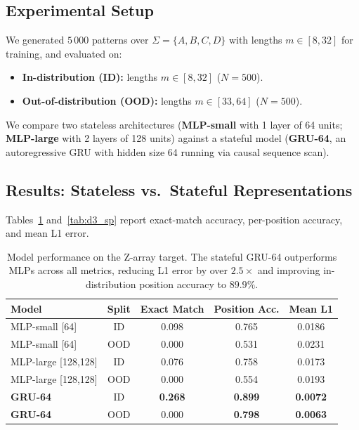 \documentclass[11pt,a4paper]{article}
\newcommand{\sigmaalph}{\Sigma}
\begin{document}
\subsection{Experimental Setup}
We generated $5\,000$ patterns over $\sigmaalph=\{A,B,C,D\}$ with lengths $m \in [8, 32]$ for training, and evaluated on:
\begin{itemize}
    \item \textbf{In-distribution (ID):} lengths $m \in [8, 32]$ ($N=500$).
    \item \textbf{Out-of-distribution (OOD):} lengths $m \in [33, 64]$ ($N=500$).
\end{itemize}
We compare two stateless architectures (\textbf{MLP-small} with 1 layer of 64 units; \textbf{MLP-large} with 2 layers of 128 units) against a stateful model (\textbf{GRU-64}, an autoregressive GRU with hidden size 64 running via causal sequence scan).

\subsection{Results: Stateless vs.\ Stateful Representations}
Tables~\ref{tab:d3_z} and~\ref{tab:d3_sp} report exact-match accuracy, per-position accuracy, and mean L1 error.

\begin{table}[t]
\centering
\small
\begin{tabular}{@{}l c c c c@{}}
\toprule
Model & Split & Exact Match & Position Acc. & Mean L1 \\
\midrule
MLP-small [64] & ID & 0.098 & 0.765 & 0.0186 \\
MLP-small [64] & OOD & 0.000 & 0.531 & 0.0231 \\
MLP-large [128,128] & ID & 0.076 & 0.758 & 0.0173 \\
MLP-large [128,128] & OOD & 0.000 & 0.554 & 0.0193 \\
\textbf{GRU-64} & ID & \textbf{0.268} & \textbf{0.899} & \textbf{0.0072} \\
\textbf{GRU-64} & OOD & 0.000 & \textbf{0.798} & \textbf{0.0063} \\
\bottomrule
\end{tabular}
\caption{Model performance on the Z-array target. The stateful GRU-64 outperforms MLPs across all metrics, reducing L1 error by over $2.5\times$ and improving in-distribution position accuracy to $89.9\%$.}
\label{tab:d3_z}
\end{table}
\end{document}
